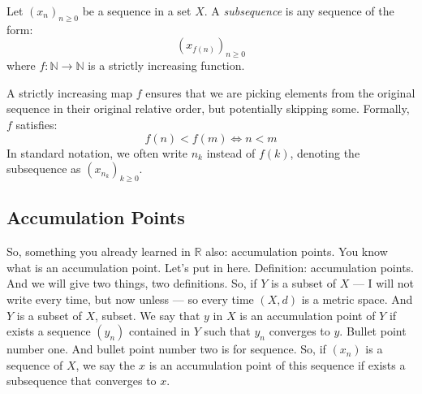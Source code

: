\begin{math-stroke}
\setcounter{theorem}{21}
\begin{definition}[Subsequence]\label{def:subsequence}
Let $(x_n)_{n \ge 0}$ be a sequence in a set $X$. A \emph{subsequence} is any sequence of the form:
\[ (x_{f(n)})_{n \ge 0} \]
where $f: \mathbb{N} \to \mathbb{N}$ is a strictly increasing function.
\end{definition}

\begin{explanation-of-steps}
A strictly increasing map $f$ ensures that we are picking elements from the original sequence in their original relative order, but potentially skipping some. Formally, $f$ satisfies:
\[ f(n) < f(m) \iff n < m \]
In standard notation, we often write $n_k$ instead of $f(k)$, denoting the subsequence as $(x_{n_k})_{k \ge 0}$.
\end{explanation-of-steps}
\end{math-stroke}


\subsection*{Accumulation Points}

\begin{spoken-clean}[00:17:23 - 00:18:44]
So, something you already learned in $\mathbb{R}$ also: accumulation points. You know what is an accumulation point. Let's put in here. Definition: accumulation points. And we will give two things, two definitions. So, if $Y$ is a subset of $X$ — I will not write every time, but now unless — so every time $(X, d)$ is a metric space. And $Y$ is a subset of $X$, subset. We say that $y$ in $X$ is an accumulation point of $Y$ if exists a sequence $(y_n)$ contained in $Y$ such that $y_n$ converges to $y$. Bullet point number one. And bullet point number two is for sequence. So, if $(x_n)$ is a sequence of $X$, we say the $x$ is an accumulation point of this sequence if exists a subsequence that converges to $x$.
\end{spoken-clean}

